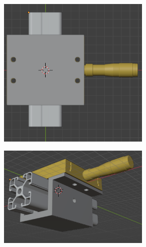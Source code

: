 \begin{figure}[!ht]
		\begin{minipage}[c]{0.5\textwidth}
		\begin{subfigure}{\textwidth}
			\centering
			\includegraphics[width=0.8\textwidth]{Figures/21_04_2025/Vista_trasera_tornillo_perfil}
			\captionsetup{width=0.8\textwidth}
			\label{fig:}
		\end{subfigure}
	\end{minipage}\begin{minipage}[c]{0.49\textwidth}
		\begin{subfigure}{\textwidth}
			\centering
			\includegraphics[width=0.8\textwidth]{Figures/21_04_2025/Vista_3_4_tornillo_perfil1}
			\captionsetup{width=0.8\textwidth}
			\label{fig:}
		\end{subfigure}
	\end{minipage}

	\caption{}
	\label{fig:}
\end{figure}







